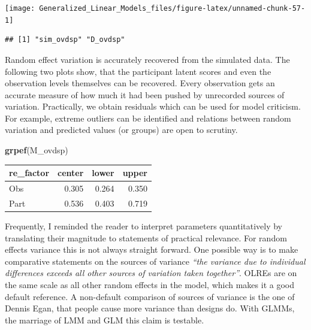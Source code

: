 \documentclass[]{svmono}
\newenvironment{Shaded}{\begin{snugshade}}{\end{snugshade}}
\newcommand{\KeywordTok}[1]{\textcolor[rgb]{0.13,0.29,0.53}{\textbf{#1}}}
\newcommand{\DataTypeTok}[1]{\textcolor[rgb]{0.13,0.29,0.53}{#1}}
\newcommand{\DecValTok}[1]{\textcolor[rgb]{0.00,0.00,0.81}{#1}}
\newcommand{\StringTok}[1]{\textcolor[rgb]{0.31,0.60,0.02}{#1}}
\newcommand{\OperatorTok}[1]{\textcolor[rgb]{0.81,0.36,0.00}{\textbf{#1}}}
\newcommand{\NormalTok}[1]{#1}
\begin{document}
\texttt{[image: Generalized\_Linear\_Models\_files/figure-latex/unnamed-chunk-57-1]}

\begin{verbatim}
## [1] "sim_ovdsp" "D_ovdsp"
\end{verbatim}

\begin{Shaded}
\end{Shaded}

Random effect variation is accurately recovered from the simulated data.
The following two plots show, that the participant latent scores and
even the observation levels themselves can be recovered. Every
observation gets an accurate measure of how much it had been pushed by
unrecorded sources of variation. Practically, we obtain residuals which
can be used for model criticism. For example, extreme outliers can be
identified and relations between random variation and predicted values
(or groups) are open to scrutiny.

\begin{Shaded}
\begin{Highlighting}[]
\KeywordTok{grpef}\NormalTok{(M_ovdsp)}
\end{Highlighting}
\end{Shaded}

\begin{longtable}[]{@{}lrrr@{}}
\toprule
re\_factor & center & lower & upper\tabularnewline
\midrule
\endhead
Obs & 0.305 & 0.264 & 0.350\tabularnewline
Part & 0.536 & 0.403 & 0.719\tabularnewline
\bottomrule
\end{longtable}

Frequently, I reminded the reader to interpret parameters quantitatively
by translating their magnitude to statements of practical relevance. For
random effects variance this is not always straight forward. One
possible way is to make comparative statements on the sources of
variance \emph{``the variance due to individual differences exceeds all
other sources of variation taken together''}. OLREs are on the same
scale as all other random effects in the model, which makes it a good
default reference. A non-default comparison of sources of variance is
the one of Dennis Egan, that people cause more variance than designs do.
With GLMMs, the marriage of LMM and GLM this claim is testable.
\end{document}
